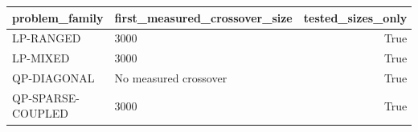 \begin{table}
\label{tab:crossover-size}
\begin{tabular}{llr}
\toprule
problem\_family & first\_measured\_crossover\_size & tested\_sizes\_only \\
\midrule
LP-RANGED & 3000 & True \\
LP-MIXED & 3000 & True \\
QP-DIAGONAL & No measured crossover & True \\
QP-SPARSE-COUPLED & 3000 & True \\
\bottomrule
\end{tabular}
\end{table}
